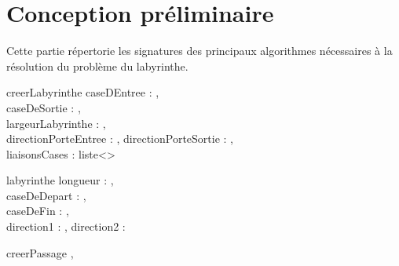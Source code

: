 \chapter{Conception préliminaire}

\setlength{\parskip}{0.05cm}

Cette partie répertorie les signatures des principaux algorithmes nécessaires à la résolution du problème du labyrinthe.
\vspace{0.5mm}

\begin{algorithme}
    \signaturefonction
        {creerLabyrinthe}
        {caseDEntree : {\naturelNonNul}, \\ 
         caseDeSortie : {\naturelNonNul}, \\ 
         largeurLabyrinthe : {\naturelNonNul}, \\ 
         directionPorteEntree : {\direction}, directionPorteSortie : {\direction}, \\ 
         liaisonsCases : liste<{\cdc}>}
        {\Labyrinthe}
\end{algorithme}

\begin{algorithme}
    \signaturefonction
        {labyrinthe}
        {longueur : {\naturelNonNul}, \\ 
         caseDeDepart : {\naturelNonNul}, \\ 
         caseDeFin : {\naturelNonNul}, \\ 
         direction1 : {\direction}, direction2 : {\direction}}
        {\Labyrinthe}
\end{algorithme}

\begin{algorithme}
    \signatureprocedure
        {creerPassage}
        {, \\ 
         }
\end{algorithme}

